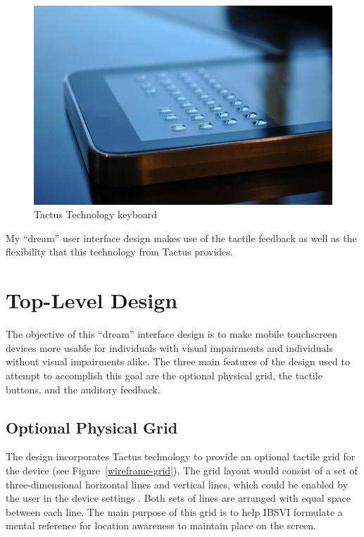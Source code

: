 \documentclass[11pt]{article}
\begin{document}
\begin{figure}[ht]
\centering
\includegraphics[width=4.5in]{tactus2.jpg} 
\caption{Tactus Technology keyboard}
\label{tactus1}
\end{figure}

My ``dream'' user interface design makes use of the tactile feedback as well as the flexibility that this technology from Tactus provides.


\section{Top-Level Design}
The objective of this ``dream'' interface design is to make mobile touchscreen devices more usable for individuals with visual impairments and individuals without visual impairments alike. The three main features of the design used to attempt to accomplish this goal are the optional physical grid, the tactile buttons, and the auditory feedback. 


\subsection{Optional Physical Grid}
The design incorporates Tactus technology to provide an optional tactile grid for the device (see Figure~\ref{wireframe-grid}). The grid layout would consist of a set of three-dimensional horizontal lines and vertical lines, which could be enabled by the user in the device settings . Both sets of lines are arranged with equal space between each line. The main purpose of this grid is to help IBSVI formulate a mental reference for location awareness to maintain place on the screen.
\end{document}
